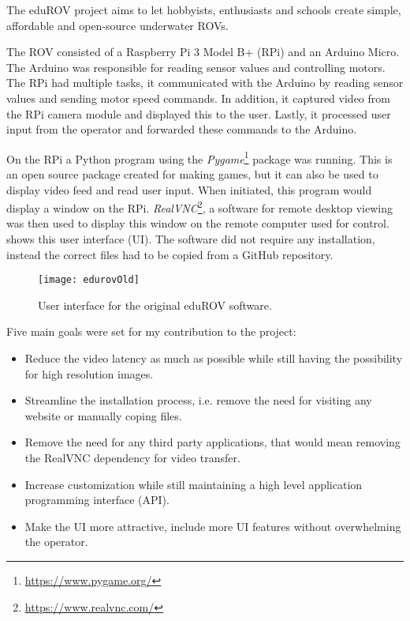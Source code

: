 The eduROV project aims to let hobbyists, enthusiasts and schools create simple, affordable and open-source underwater ROVs. 

The ROV consisted of a Raspberry Pi 3 Model B+ (RPi) and an Arduino Micro. The Arduino was responsible for reading sensor values and controlling motors. The RPi had multiple tasks, it communicated with the Arduino by reading sensor values and sending motor speed commands. In addition, it captured video from the RPi camera module and displayed this to the user. Lastly, it processed user input from the operator and forwarded these commands to the Arduino.

On the RPi a Python program using the \emph{Pygame}\footnote{\url{https://www.pygame.org/}} package was running. This is an open source package created for making games, but it can also be used to display video feed and read user input. When initiated, this program would display a window on the RPi. \emph{RealVNC}\footnote{\url{https://www.realvnc.com/}}, a software for remote desktop viewing was then used to display this window on the remote computer used for control.  shows this user interface (UI). The software did not require any installation, instead the correct files had to be copied from a GitHub repository.

\begin{figure}[h!]
    \centering
    \texttt{[image: edurovOld]}
    \caption{User interface for the original eduROV software.}
    \label{edurovOld}
\end{figure}

Five main goals were set for my contribution to the project:

\begin{itemize}
\item Reduce the video latency as much as possible while still having the possibility for high resolution images.

\item Streamline the installation process, i.e. remove the need for visiting any website or manually coping files.

\item Remove the need for any third party applications, that would mean removing the RealVNC dependency for video transfer.

\item Increase customization while still maintaining a high level application programming interface (API).

\item Make the UI more attractive, include more UI features without overwhelming the operator.
\end{itemize}

